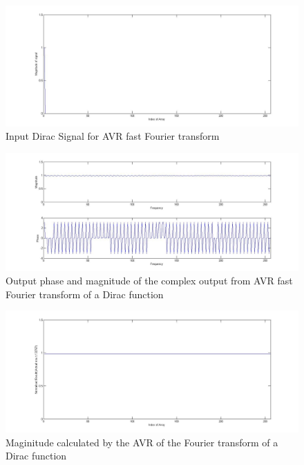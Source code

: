 \begin{figure}
\includegraphics[width=\textwidth]{./Figures/AVR_FFT_Dirac_Input.jpg}
\caption{Input Dirac Signal for AVR fast Fourier transform}
\label{fig:AVR:FFT:Dirac:Input}
\end{figure}
\begin{figure}
\includegraphics[width=\textwidth]{./Figures/AVR_FFT_Dirac_Complex_Output.jpg}
\caption{Output phase and magnitude of the complex output from AVR fast Fourier transform of a Dirac function}
\label{fig:AVR:FFT:Dirac:Output}
\end{figure}
\begin{figure}
\includegraphics[width=\textwidth]{./Figures/AVR_FFT_Dirac_Mag.jpg}
\caption{Maginitude calculated by the AVR of the Fourier transform of a Dirac function}
\label{fig:AVR:FFT:Dirac:Mag}
\end{figure}

